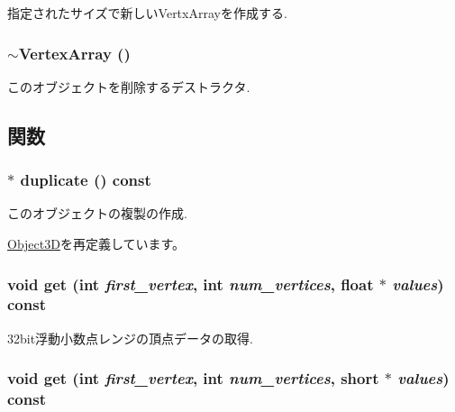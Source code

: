 指定されたサイズで新しいVertxArrayを作成する. \hypertarget{classm3g_1_1VertexArray_267fa63cb2f4216729437dc826415911}{
\subsubsection[{$\sim$VertexArray}]{\setlength{\rightskip}{0pt plus 5cm}$\sim${\bf VertexArray} ()}}
\label{classm3g_1_1VertexArray_267fa63cb2f4216729437dc826415911}


このオブジェクトを削除するデストラクタ. 

\subsection{関数}
\hypertarget{classm3g_1_1VertexArray_f0dc6a5510bf837ef48129f344d666a8}{
\subsubsection[{duplicate}]{ $\ast$ duplicate () const}}
\label{classm3g_1_1VertexArray_f0dc6a5510bf837ef48129f344d666a8}


このオブジェクトの複製の作成. 

\hyperlink{classm3g_1_1Object3D_a25110dac934f867b83b73ad4741a0f4}{Object3D}を再定義しています。\hypertarget{classm3g_1_1VertexArray_79b1ffd7586fe23fb5e31661e4d296e3}{
\subsubsection[{get}]{\setlength{\rightskip}{0pt plus 5cm}void get (int {\em first\_\-vertex}, \/  int {\em num\_\-vertices}, \/  float $\ast$ {\em values}) const}}
\label{classm3g_1_1VertexArray_79b1ffd7586fe23fb5e31661e4d296e3}


32bit浮動小数点レンジの頂点データの取得. \hypertarget{classm3g_1_1VertexArray_575822f60d7b5e74ed51e94851123038}{
\subsubsection[{get}]{\setlength{\rightskip}{0pt plus 5cm}void get (int {\em first\_\-vertex}, \/  int {\em num\_\-vertices}, \/  short $\ast$ {\em values}) const}}
\label{classm3g_1_1VertexArray_575822f60d7b5e74ed51e94851123038}


